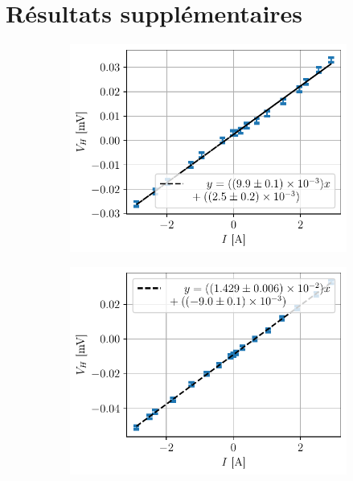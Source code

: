 \section{Résultats supplémentaires}
\label{sec:supp}

\begin{figure}[h]
    \centering
    \begin{subfigure}{0.5\textwidth}
        \includegraphics[width=\linewidth]{figures/Ag_I.pdf}
        \caption{}
        \label{fig:Ag_I}
    \end{subfigure}%
    \begin{subfigure}{0.5\textwidth}
        \includegraphics[width=\linewidth]{figures/Cu_I.pdf}
        \caption{}
        \label{fig:Cu_I}

\end{subfigure}
\end{figure}
